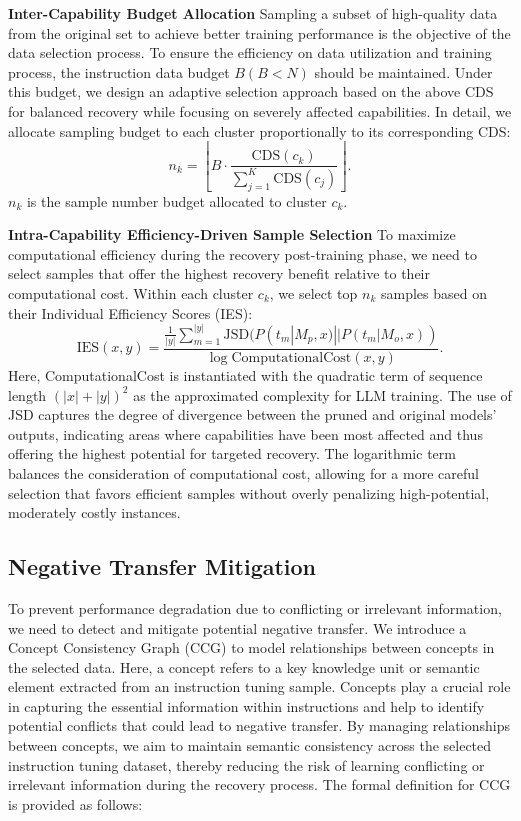 \textbf{Inter-Capability Budget Allocation} Sampling a subset of high-quality data from the original set to achieve better training performance is the objective of the data selection process. To ensure the efficiency on data utilization and training process, the instruction data budget $B (B < N)$ should be maintained. Under this budget, we design an adaptive selection approach based on the above CDS for balanced recovery while focusing on severely affected capabilities. In detail, we allocate sampling budget to each cluster proportionally to its corresponding CDS:
\begin{equation}
    n_k = \left\lfloor B \cdot \frac{\text{CDS}(c_k)}{\sum_{j=1}^K \text{CDS}(c_j)} \right\rfloor.
\end{equation}
$n_k$ is the sample number budget allocated to cluster $c_k$.

\textbf{Intra-Capability Efficiency-Driven Sample Selection} To maximize computational efficiency during the recovery post-training phase, we need to select samples that offer the highest recovery benefit relative to their computational cost.
Within each cluster $c_k$, we select top $n_k$ samples based on their Individual Efficiency Scores (IES):
\begin{equation}
    \text{IES}(x, y) = \frac{\frac{1}{|y|}\sum_{m=1}^{|y|}\text{JSD}(P(t_m|M_p, x)||P(t_m|M_o, x))}{\log \text{ComputationalCost}(x, y)}.
\end{equation}
Here, ComputationalCost is instantiated with the quadratic term of sequence length $(|x| + |y|)^2 $ as the approximated complexity for LLM training. The use of JSD captures the degree of divergence between the pruned and original models' outputs, indicating areas where capabilities have been most affected and thus offering the highest potential for targeted recovery. The logarithmic term balances the consideration of computational cost, allowing for a more careful selection that favors efficient samples without overly penalizing high-potential, moderately costly instances.


\subsection{Negative Transfer Mitigation}
\label{sec:negative}
To prevent performance degradation due to conflicting or irrelevant information, we need to detect and mitigate potential negative transfer. We introduce a Concept Consistency Graph (CCG) to model relationships between concepts in the selected data. Here, a concept refers to a key knowledge unit or semantic element extracted from an instruction tuning sample. Concepts play a crucial role in capturing the essential information within instructions and help to identify potential conflicts that could lead to negative transfer. By managing relationships between concepts, we aim to maintain semantic consistency across the selected instruction tuning dataset, thereby reducing the risk of learning conflicting or irrelevant information during the recovery process. The formal definition for CCG is provided as follows:

